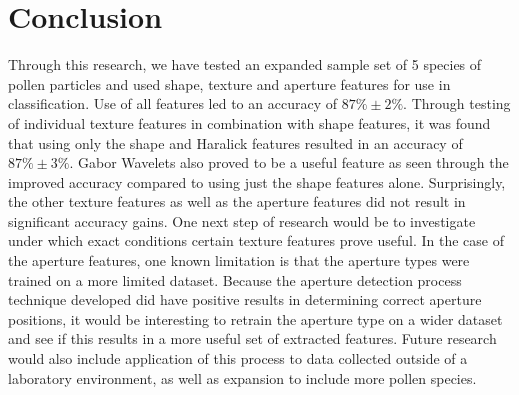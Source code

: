\section{Conclusion}

Through this research, we have tested an expanded sample set of 5 species of pollen particles and used shape, texture and aperture features for use in classification. Use of all features led to an accuracy of $87\% \pm 2\%$. Through testing of individual texture features in combination with shape features, it was found that using only the shape and Haralick features resulted in an accuracy of $87\% \pm 3\%$. Gabor Wavelets also proved to be a useful feature as seen through the improved accuracy compared to using just the shape features alone. Surprisingly, the other texture features as well as the aperture features did not result in significant accuracy gains. One next step of research would be to investigate under which exact conditions certain texture features prove useful. In the case of the aperture features, one known limitation is that the aperture types were trained on a more limited dataset. Because the aperture detection process technique developed did have positive results in determining correct aperture positions, it would be interesting to retrain the aperture type on a wider dataset and see if this results in a more useful set of extracted features. Future research would also include application of this process to data collected outside of a laboratory environment, as well as expansion to include more pollen species.
    
  
  
  
  